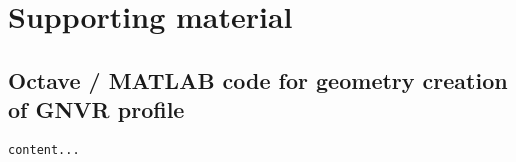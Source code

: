 \chapter{Supporting material}
\section{Octave / MATLAB code for geometry creation of GNVR profile}
\begin{verbatim}
content...
\end{verbatim}